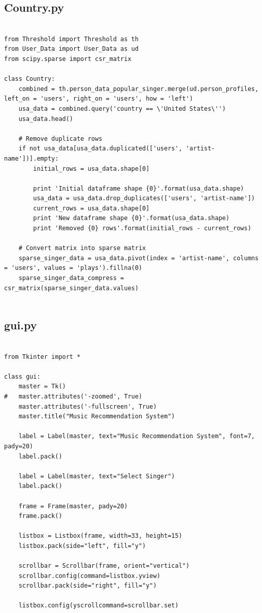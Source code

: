 \documentclass[paper=a4, fontsize=12pt]{scrartcl}
\numberwithin{equation}{section}		%
\numberwithin{figure}{section}			%
\numberwithin{table}{section}				%
\begin{document}
\subsection{Country.py}
\scriptsize
\begin{lstlisting}

from Threshold import Threshold as th
from User_Data import User_Data as ud
from scipy.sparse import csr_matrix

class Country:
	combined = th.person_data_popular_singer.merge(ud.person_profiles, left_on = 'users', right_on = 'users', how = 'left')
	usa_data = combined.query('country == \'United States\'')
	usa_data.head()

	# Remove duplicate rows
	if not usa_data[usa_data.duplicated(['users', 'artist-name'])].empty:
	    initial_rows = usa_data.shape[0]

	    print 'Initial dataframe shape {0}'.format(usa_data.shape)
	    usa_data = usa_data.drop_duplicates(['users', 'artist-name'])
	    current_rows = usa_data.shape[0]
	    print 'New dataframe shape {0}'.format(usa_data.shape)
	    print 'Removed {0} rows'.format(initial_rows - current_rows)

	# Convert matrix into sparse matrix
	sparse_singer_data = usa_data.pivot(index = 'artist-name', columns = 'users', values = 'plays').fillna(0)
	sparse_singer_data_compress = csr_matrix(sparse_singer_data.values)


\end{lstlisting}

\subsection{gui.py}
\scriptsize
\begin{lstlisting}

from Tkinter import *

class gui:
	master = Tk()
#	master.attributes('-zoomed', True)
	master.attributes('-fullscreen', True)
	master.title("Music Recommendation System")

	label = Label(master, text="Music Recommendation System", font=7, pady=20)
	label.pack()

	label = Label(master, text="Select Singer")
	label.pack()

	frame = Frame(master, pady=20)
	frame.pack()

	listbox = Listbox(frame, width=33, height=15)
	listbox.pack(side="left", fill="y")

	scrollbar = Scrollbar(frame, orient="vertical")
	scrollbar.config(command=listbox.yview)
	scrollbar.pack(side="right", fill="y")

	listbox.config(yscrollcommand=scrollbar.set)

\end{lstlisting}
\end{document}
